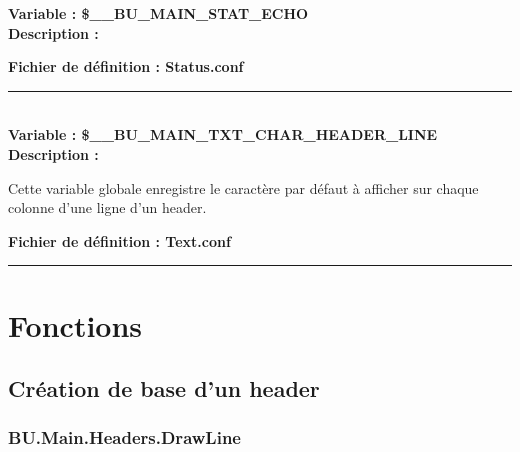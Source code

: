 \documentclass[a4paper,10pt]{article}
\begin{document}
    \textbf{Variable : \color{vars}\$\_\_BU\_MAIN\_STAT\_ECHO}\\[1\baselineskip]

    \textbf{Description :}

    \textbf{Fichier de définition : \color{path}Status.conf}\\[1\baselineskip]




    \color{vars}\par\noindent\rule{\textwidth}{0.4pt}\color{text}\\[1\baselineskip]

    \textbf{Variable : \color{vars}\$\_\_BU\_MAIN\_TXT\_CHAR\_HEADER\_LINE}\\[1\baselineskip]

    \textbf{Description :}

    \begin{justify}
        Cette variable globale enregistre le caractère par défaut à afficher sur chaque colonne d'une ligne d'un header.
    \end{justify}

    \textbf{Fichier de définition : \color{path}Text.conf}\\[1\baselineskip]





    \color{sec1}\par\noindent\rule{\textwidth}{0.4pt}\color{text}

    \color{sec1}
    \section{Fonctions}\color{text}

    \color{sec2}
    \subsection{Création de base d'un header}\color{text}

    \color{sec3}
    \subsubsection{BU.Main.Headers.DrawLine}\color{text}
\end{document}
